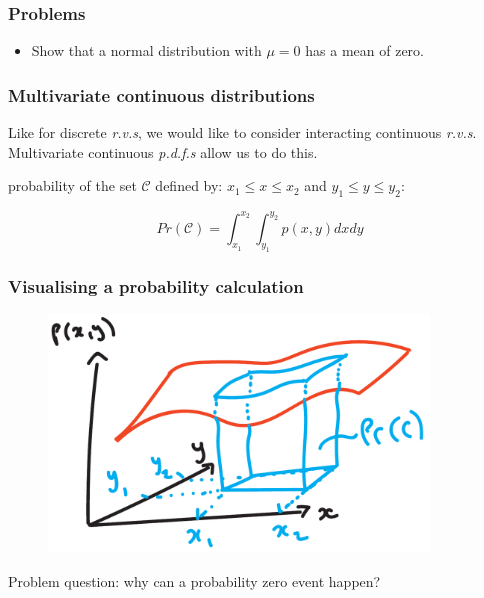 \documentclass{beamer}
\begin{document}
	\begin{frame}
		\frametitle{Problems}
		
		\begin{itemize}
			\item Show that a normal distribution with $\mu=0$ has a mean of zero.
		\end{itemize}
		
	\end{frame}
	
	\begin{frame}
		\frametitle{Multivariate continuous distributions}
		
		Like for discrete \textit{r.v.s}, we would like to consider interacting continuous \textit{r.v.s}. Multivariate continuous \textit{p.d.f.s} allow us to do this.
		
		\vspace{0.5cm}
		
		probability of the set $\mathcal{C}$ defined by: $x_1 \leq x \leq x_2$ and $y_1 \leq y \leq y_2$: 
		
		\begin{equation}
		 Pr(\mathcal{C}) = \int_{x_1}^{x_2}\int_{y_1}^{y_2} p(x, y)dx dy
		\end{equation}
		
	\end{frame}
	
	\begin{frame}
		\frametitle{Visualising a probability calculation}
		
		\begin{figure}[ht]
			\centerline{\includegraphics[width=0.9\textwidth]{./figures/multivariate_continuous_volume.pdf}}
		\end{figure}
		
	\end{frame}
	
	\begin{frame}
		Problem question: why can a probability zero event happen?
	\end{frame}
	
	
\end{document}
